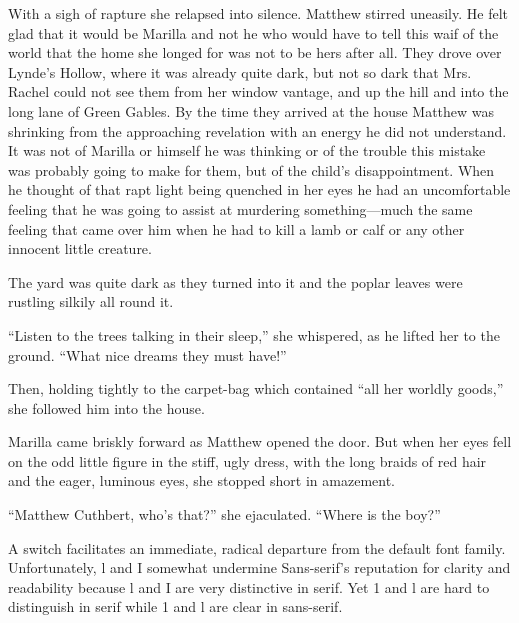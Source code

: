 \documentclass[a4paper]{article}
\begin{document}
With a sigh of rapture she relapsed into silence. Matthew stirred uneasily. He felt glad that it would be Marilla and not he who would have to tell this waif of the world that the home she longed for was not to be hers after all. They drove over Lynde's Hollow, where it was already quite dark, but not so dark that Mrs. Rachel could not see them from her window vantage, and up the hill and into the long lane of Green Gables. By the time they arrived at the house Matthew was shrinking from the approaching revelation with an energy he did not understand. It was not of Marilla or himself he was thinking or of the trouble this mistake was probably going to make for them, but of the child's disappointment. When he thought of that rapt light being quenched in her eyes he had an uncomfortable feeling that he was going to assist at murdering something---much the same feeling that came over him when he had to kill a lamb or calf or any other innocent little creature.

The yard was quite dark as they turned into it and the poplar leaves were rustling silkily all round it.

{\rmfamily``Listen to the trees talking in their sleep,'' she whispered, as he lifted her to the ground. ``What nice dreams they must have!''

Then, holding tightly to the carpet-bag which contained ``all her worldly goods,'' she followed him into the house.}

Marilla came briskly forward as Matthew opened the door. But when her eyes fell on the odd little figure in the stiff, ugly dress, with the long braids of red hair and the eager, luminous eyes, she stopped short in amazement.

``Matthew Cuthbert, who's that?'' she ejaculated. ``Where is the boy?''


\sffamily A switch facilitates an immediate, radical departure from the default font family. Unfortunately, l and I somewhat undermine Sans-serif's reputation for clarity and readability \textrm{because l and I are very distinctive in serif. Yet 1 and l are hard to distinguish in serif} while 1 and l are clear in sans-serif.
\end{document}
